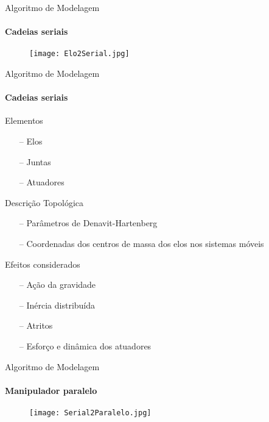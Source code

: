 \documentclass[25pt,landscape]{beamer}
\begin{document}
\begin{frame}{Algoritmo de Modelagem}
    \framesubtitle{Cadeias seriais}
	\begin{figure}[!h]
        \centering
        \texttt{[image: Elo2Serial.jpg]}
    \end{figure} 
\end{frame}

\begin{frame}{Algoritmo de Modelagem}
    \framesubtitle{Cadeias seriais}
    \begin{block}{Elementos}
		\begin{itemize}
			\item[--] Elos
			\item[--] Juntas
			\item[--] Atuadores
		\end{itemize}
    \end{block}
    \begin{block}{Descrição Topológica}
		\begin{itemize}
			\item[--] Parâmetros de Denavit-Hartenberg
			\item[--] Coordenadas dos centros de massa dos elos nos sistemas móveis
		\end{itemize}
    \end{block}
    \begin{block}{Efeitos considerados}
		\begin{itemize}
			\item[--] Ação da gravidade
			\item[--] Inércia distribuída
			\item[--] Atritos
			\item[--] Esforço e dinâmica dos atuadores
		\end{itemize}
    \end{block}
\end{frame}

\begin{frame}{Algoritmo de Modelagem}
    \framesubtitle{Manipulador paralelo}
	\begin{figure}[!h]
        \centering
        \texttt{[image: Serial2Paralelo.jpg]}
    \end{figure} 
\end{frame}
\end{document}

